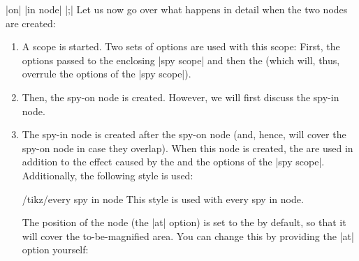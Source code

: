 \begin{command}{\spy {} |on| 
    |in node| |;|}
  Let us now go over what happens in detail when the two nodes are
  created:
  \begin{enumerate}
  \item A scope is started. Two sets of options are used with this
    scope: First, the options passed to the enclosing |spy scope| and
    then the  (which will, thus, overrule the options of
    the |spy scope|).
  \item Then, the spy-on node is created. However, we will first
    discuss the spy-in node.
  \item The spy-in node is created after the spy-on node (and, hence,
    will cover the spy-on node in case they overlap). When this node is
    created, the  are used in addition to the
    effect caused by the  and the options of the
    |{spy scope}|. Additionally, the following style is used:
    \begin{stylekey}{/tikz/every spy in node}
      This style is used with every spy in node.
    \end{stylekey}
    The position of the node (the |at| option) is set to the
     by default, so that it will cover the
    to-be-magnified area. You can change this by providing the |at|
    option yourself:
\begin{codeexample}[]
\end{codeexample}
\end{enumerate}
\end{command}

